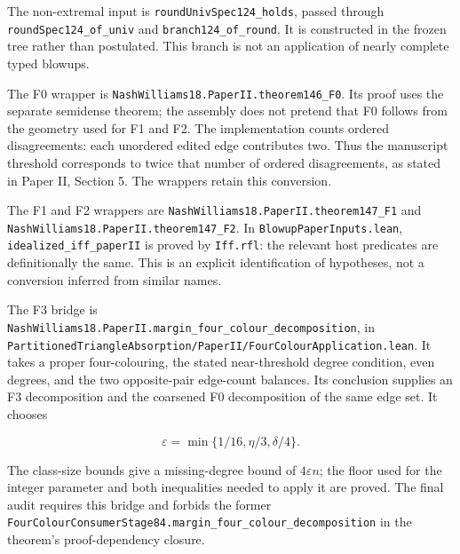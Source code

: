 \documentclass[english,11pt,a4paper]{article}
\begin{document}
The non-extremal input is \texttt{round\allowbreak{}Univ\allowbreak{}Spec124\_\allowbreak{}holds}, passed through \texttt{round\allowbreak{}Spec124\_\allowbreak{}of\_\allowbreak{}univ} and \texttt{branch124\_\allowbreak{}of\_\allowbreak{}round}. It is constructed in the frozen tree rather than postulated. This branch is not an application of nearly complete typed blowups.

The F0 wrapper is \texttt{Nash\allowbreak{}Williams18.\allowbreak{}Paper\allowbreak{}II.\allowbreak{}theorem146\_\allowbreak{}F0}. Its proof uses the separate semidense theorem; the assembly does not pretend that F0 follows from the geometry used for F1 and F2. The implementation counts ordered disagreements: each unordered edited edge contributes two. Thus the manuscript threshold corresponds to twice that number of ordered disagreements, as stated in Paper II, Section 5. The wrappers retain this conversion.

The F1 and F2 wrappers are \texttt{Nash\allowbreak{}Williams18.\allowbreak{}Paper\allowbreak{}II.\allowbreak{}theorem147\_\allowbreak{}F1} and \texttt{Nash\allowbreak{}Williams18.\allowbreak{}Paper\allowbreak{}II.\allowbreak{}theorem147\_\allowbreak{}F2}. In \texttt{Blowup\allowbreak{}Paper\allowbreak{}Inputs.\allowbreak{}lean}, \texttt{idealized\_\allowbreak{}iff\_\allowbreak{}paper\allowbreak{}II} is proved by \texttt{Iff.\allowbreak{}rfl}: the relevant host predicates are definitionally the same. This is an explicit identification of hypotheses, not a conversion inferred from similar names.

The F3 bridge is \texttt{Nash\allowbreak{}Williams18.\allowbreak{}Paper\allowbreak{}II.\allowbreak{}margin\_\allowbreak{}four\_\allowbreak{}colour\_\allowbreak{}decomposition}, in \texttt{Partitioned\allowbreak{}Triangle\allowbreak{}Absorption/\allowbreak{}Paper\allowbreak{}II/\allowbreak{}Four\allowbreak{}Colour\allowbreak{}Application.\allowbreak{}lean}. It takes a proper four-colouring, the stated near-threshold degree condition, even degrees, and the two opposite-pair edge-count balances. Its conclusion supplies an F3 decomposition and the coarsened F0 decomposition of the same edge set. It chooses

\[\varepsilon=\min\{1/16,\eta/3,\delta/4\}.\]

The class-size bounds give a missing-degree bound of \(4\varepsilon n\); the floor used for the integer parameter and both inequalities needed to apply it are proved. The final audit requires this bridge and forbids the former \texttt{Four\allowbreak{}Colour\allowbreak{}Consumer\allowbreak{}Stage84.\allowbreak{}margin\_\allowbreak{}four\_\allowbreak{}colour\_\allowbreak{}decomposition} in the theorem's proof-dependency closure.
\end{document}

